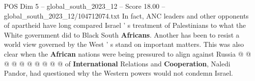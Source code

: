 \begin{textsample}{POS Dim 5 – global\_south\_2023\_12 – Score 18.00 – global\_south\_2023\_12/104712074.txt}
In fact, ANC leaders and other opponents of apartheid have long compared Israel ' s treatment of Palestinians to what the White government did to Black South \textbf{Africans}.
Another has been to resist a world view governed by the West ' s stand on important matters.
This was also clear when the \textbf{African} nations were being pressured to align against Russia @ @ @ @ @ @ @ @ @ @ of \textbf{International} Relations and \textbf{Cooperation}, Naledi Pandor, had questioned why the Western powers would not condemn Israel.

\end{textsample}
